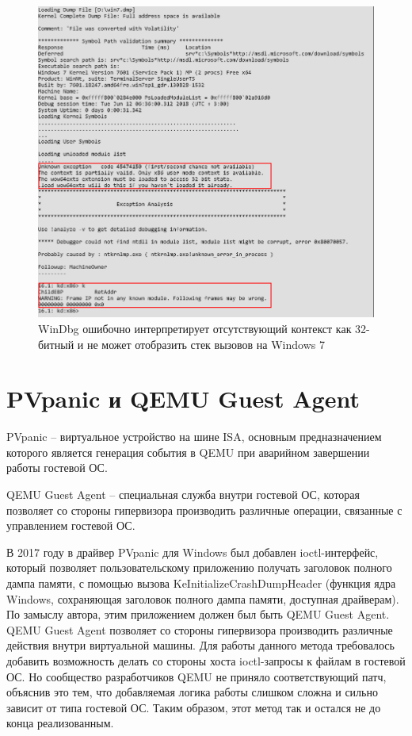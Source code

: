 \documentclass{mipt-thesis-bs}
\begin{document}
\begin{figure}[h]
\begin{center}
    \captionsetup{justification=centering}
    \includegraphics[width=1\textwidth]{vol1.png}
    \caption{WinDbg ошибочно интерпретирует отсутствующий контекст как 32-битный и не может отобразить стек вызовов на Windows 7}
    \label{fig:windbg-vol}
\end{center}
\end{figure}

\newpage
\section*{PVpanic и QEMU Guest Agent}

PVpanic -- виртуальное устройство на шине ISA, основным предназначением которого является генерация события в QEMU при аварийном завершении работы гостевой ОС.

QEMU Guest Agent -- специальная служба внутри гостевой ОС, которая позволяет со стороны гипервизора производить различные операции, связанные с управлением гостевой ОС.

В 2017 году в драйвер PVpanic для Windows был добавлен ioctl-интерфейс, который позволяет пользовательскому приложению получать заголовок полного дампа памяти, с помощью вызова KeInitializeCrashDumpHeader (функция ядра Windows, сохраняющая заголовок полного дампа памяти, доступная драйверам\cite{kicdh}). По замыслу автора, этим приложением должен был быть QEMU Guest Agent\cite{qgaioctl}. QEMU Guest Agent позволяет со стороны гипервизора производить различные действия внутри виртуальной машины. Для работы данного метода требовалось добавить возможность делать со стороны хоста ioctl-запросы к файлам в гостевой ОС. Но сообщество разработчиков QEMU не приняло соответствующий патч, объяснив это тем, что добавляемая логика работы слишком сложна и сильно зависит от типа гостевой ОС.
Таким образом, этот метод так и остался не до конца реализованным.
\end{document}
